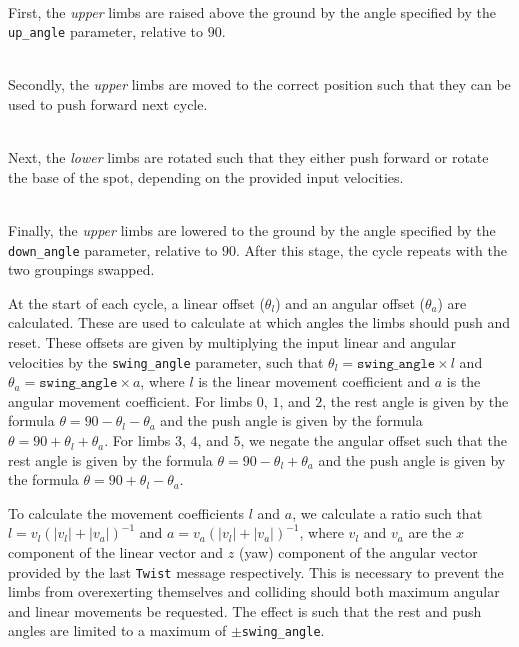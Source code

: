 \begin{description}[labelindent=\parindent]
	\item[1. Raise] \hfill \\
	First, the \emph{upper} limbs are raised above the ground by the angle specified by the \texttt{up\_angle} parameter, relative to $90$\textdegree{}.  

	\item[2. Reset] \hfill \\
	Secondly, the \emph{upper} limbs are moved to the correct position such that they can be used to push forward next cycle.

	\item[3. Push] \hfill \\
	Next, the \emph{lower} limbs are rotated such that they either push forward or rotate the base of the spot, depending on the provided input velocities.

	\item[4. Lower] \hfill \\
	Finally, the \emph{upper} limbs are lowered to the ground by the angle specified by the \texttt{down\_angle} parameter, relative to $90$\textdegree{}. After this stage, the cycle repeats with the two groupings swapped.
\end{description}

At the start of each cycle, a linear offset ($\theta_l$) and an angular offset ($\theta_a$) are calculated. These are used to calculate at which angles the limbs should push and reset. These offsets are given by multiplying the input linear and angular velocities by the \texttt{swing\_angle} parameter, such that $\theta_l = \texttt{swing\_angle} \times l$ and $\theta_a = \texttt{swing\_angle} \times a$, where $l$ is the linear movement coefficient and $a$ is the angular movement coefficient. For limbs $0$, $1$, and $2$, the rest angle is given by the formula $\theta = 90 - \theta_l - \theta_a$ and the push angle is given by the formula $\theta = 90 + \theta_l + \theta_a$. For limbs $3$, $4$, and $5$, we negate the angular offset such that the rest angle is given by the formula $\theta = 90 - \theta_l + \theta_a$ and the push angle is given by the formula $\theta = 90 + \theta_l - \theta_a$.

To calculate the movement coefficients $l$ and $a$, we calculate a ratio such that $l = v_l(|v_l| + |v_a|)^{-1}$ and $a = v_a(|v_l| + |v_a|)^{-1}$, where $v_l$ and $v_a$ are the $x$ component of the linear vector and $z$ (yaw) component of the angular vector provided by the last \texttt{Twist} message respectively. This is necessary to prevent the limbs from overexerting themselves and colliding should both maximum angular and linear movements be requested. The effect is such that the rest and push angles are limited to a maximum of $\pm$\texttt{swing\_angle}.


